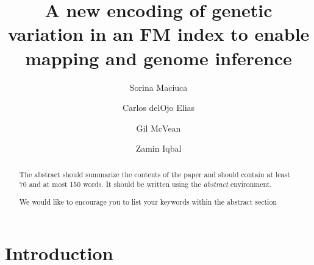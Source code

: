 \documentclass[runningheads,a4paper]{llncs}
\newcommand{\keywords}[1]{\par\addvspace\baselineskip
\noindent\keywordname\enspace\ignorespaces#1}
\begin{document}
\mainmatter  %

\title{A new encoding of genetic variation in an FM index to enable mapping and genome inference}


%
%
\author{Sorina Maciuca%
\and Carlos delOjo Elias\and Gil McVean \and Zamin Iqbal}
%



\maketitle


\begin{abstract}
The abstract should summarize the contents of the paper and should
contain at least 70 and at most 150 words. It should be written using the
\emph{abstract} environment.
\keywords{We would like to encourage you to list your keywords within
the abstract section}
\end{abstract}

\section{Introduction}
\end{document}
